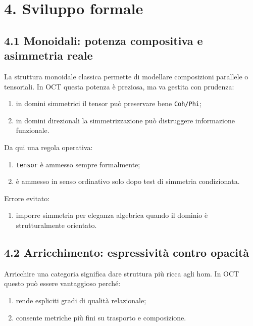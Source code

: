 \section{4. Sviluppo formale}

\subsection{4.1 Monoidali: potenza compositiva e asimmetria reale}

La struttura monoidale classica permette di modellare composizioni parallele o tensoriali. In OCT questa potenza è preziosa, ma va gestita con prudenza:

\begin{enumerate}
\def\labelenumi{\arabic{enumi}.}
\tightlist
\item
  in domini simmetrici il tensor può preservare bene \texttt{Coh/Phi};
\item
  in domini direzionali la simmetrizzazione può distruggere informazione funzionale.
\end{enumerate}

Da qui una regola operativa:

\begin{enumerate}
\def\labelenumi{\arabic{enumi}.}
\tightlist
\item
  \texttt{tensor} è ammesso sempre formalmente;
\item
  è ammesso in senso ordinativo solo dopo test di simmetria condizionata.
\end{enumerate}

Errore evitato:

\begin{enumerate}
\def\labelenumi{\arabic{enumi}.}
\tightlist
\item
  imporre simmetria per eleganza algebrica quando il dominio è strutturalmente orientato.
\end{enumerate}

\subsection{4.2 Arricchimento: espressività contro opacità}

Arricchire una categoria significa dare struttura più ricca agli hom. In OCT questo può essere vantaggioso perché:

\begin{enumerate}
\def\labelenumi{\arabic{enumi}.}
\tightlist
\item
  rende espliciti gradi di qualità relazionale;
\item
  consente metriche più fini su trasporto e composizione.
\end{enumerate}

